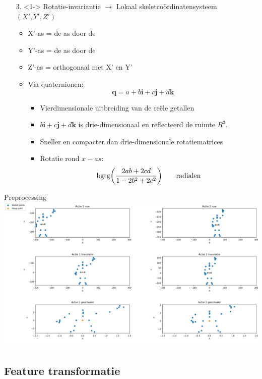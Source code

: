 \documentclass[]{beamer}
\begin{document}
	\begin{frame}
		\begin{enumerate}
			\item[3.]<1-> Rotatie-invariantie $\rightarrow$ Lokaal skeletcoördinatensysteem $(X', Y', Z')$
			\begin{itemize}
				\item X'-as = de as door de 
				\item Y'-as = de as door de 
				\item Z'-as = orthogonaal met X' en Y'
				\item Via quaternionen:
				$$\textbf{q} = a + b\textbf{i} + c\textbf{j} + d\textbf{k}$$
				\begin{itemize}
					\item Vierdimensionale uitbreiding van de reële getallen
					\item $b\textbf{i} + c\textbf{j} + d\textbf{k}$ is drie-dimensionaal en reflecteerd de ruimte $R^3$.
						\item Sneller en compacter dan drie-dimensionale rotatiematrices
					\item Rotatie rond $x-as$:
					$$
						\hbox{bgtg}\bigg(\frac{2ab + 2cd}{1 - 2b^2 + 2c^2}\bigg)\qquad \hbox{radialen}
					$$

				
				\end{itemize}

				
			\end{itemize}
	\end{enumerate}
	\end{frame}
	\begin{frame}{Preprocessing}
	\includegraphics[width=\textwidth]{skeleton_preprocessing}
	\end{frame}
	
	\subsection{Feature transformatie}
	
\end{document}
